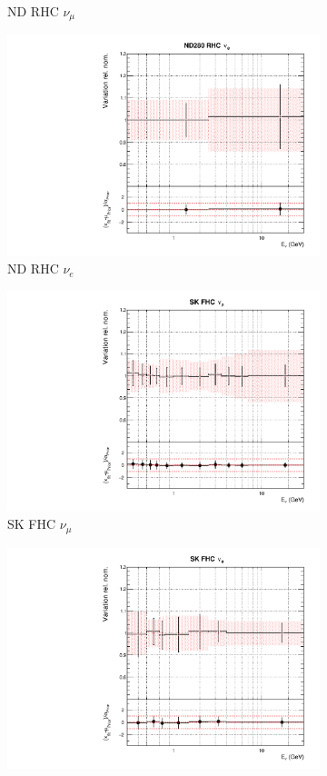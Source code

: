 \begin{figure}
\begin{subfigure}{0.24\textwidth}
  \caption{ND RHC $\nu_{\mu}$}
  \label{fig:}
\end{subfigure}
\vspace{15mm}
\begin{subfigure}{0.24\textwidth}
  \centering
  \includegraphics[width=0.95\linewidth]{figs/asmvflux7}
  \caption{ND RHC $\nu_e$}
  \label{fig:}
\end{subfigure}
\begin{subfigure}{0.24\textwidth}
  \centering
  \includegraphics[width=0.95\linewidth]{figs/asmvflux8}
  \caption{SK FHC $\nu_{\mu}$}
  \label{fig:}
\end{subfigure}
\begin{subfigure}{0.24\textwidth}
  \centering
  \includegraphics[width=0.95\linewidth]{figs/asmvflux9}

\end{subfigure}
\end{figure}
